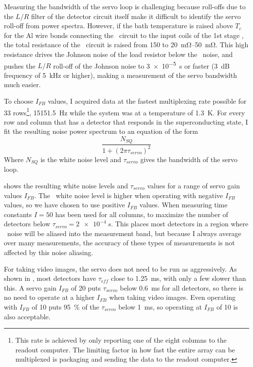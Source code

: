 Measuring the bandwidth of the servo loop is challenging because roll-offs due to the $L/R$ filter of the detector circuit itself make it difficult to identify the servo roll-off from power spectra.
However, if the bath temperature is raised above $T_c$ for the Al wire bonds connecting the \TES\ circuit to the input coils of the 1st stage \SQUIDs, the total resistance of the \TES\ circuit is raised from \SI{150}{\uOhm} to \SIrange{20}{50}{\mohm}.
This high resistance drives the Johnson noise of the load resistor below the \SQUID\ noise, and pushes the $L/R$ roll-off of the Johnson noise to \SI{3e-5}{s} or faster (\SI{3}{\dB} frequency of \SI{5}{\kilo\Hz} or higher), making a measurement of the servo bandwidth much easier.

To choose $I_{FB}$ values, I acquired data at the fastest multiplexing rate possible for 33 rows\footnote{This rate is achieved by only reporting one of the eight columns to the readout computer. The limiting factor in how fast the entire array can be multiplexed is packaging and sending the data to the readout computer.}, \SI{15151.5}{Hz} while the system was at a temperature of \SI{1.3}{\K}.
For every row and column that has a detector that responds in the superconducting state, I fit the resulting noise power spectrum to an equation of the form
\begin{equation}
  \frac{N_{SQ}}{1 + (2 \pi \tau_{servo})^2}
\end{equation}
Where $N_{SQ}$ is the white noise level and $\tau_{servo}$ gives the bandwidth of the servo loop.

 shows the resulting white noise levels and $\tau_{servo}$ values for a range of servo gain values $I_{FB}$.
The \SQUID\ white noise level is higher when operating with negative $I_{FB}$ values, so we have chosen to use positive $I_{FB}$ values.
When measuring time constants $I=50$ has been used for all columns, to maximize the number of detectors below $\tau_{servo} = \SI{2e-4}{s}$.
This places most detectors in a region where \SQUID\ noise will be aliased into the measurement band, but because I always average over many measurements, the accuracy of these types of measurements is not affected by this noise aliasing.

For taking video images, the servo does not need to be run as aggressively.
As shown in , most detectors have $\tau_{eff}$ close to \SI{1.25}{\ms}, with only a few slower than this.
A servo gain $I_{FB}$ of 20 puts $\tau_{servo}$ below \SI{0.6}{\ms} for all detectors, so there is no need to operate at a higher $I_{FB}$ when taking video images.
Even operating with $I_{FB}$ of 10 puts \SI{95}{\percent} of the $\tau_{servo}$ below \SI{1}{\ms}, so operating at $I_{FB}$ of 10 is also acceptable.

